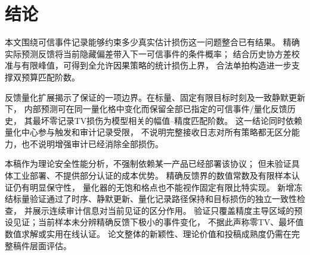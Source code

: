 \section{结论}
本文围绕可信事件记录能够约束多少真实估计损伤这一问题整合已有结果。
精确实际预测反馈将当前隐藏偏差带入下一可信事件的条件概率；
结合历史协方差校准与有限峰值，可得到全允许因果策略的统计损伤上界，
合法单拍构造进一步支撑双预算匹配阶数。

反馈量化扩展揭示了保证的一项边界。在标量、固定有限目标时刻及一致静默更新下，
内部预测可在同一量化格中变化而保留全部已指定的可信事件/量化反馈历史，
其最坏零记录TV损伤为模型相关的幅值--精度匹配阶数。
这一结论同时依赖量化中心参与触发和审计记录受限，
不说明完整接收日志对所有策略都无区分能力，也不说明增强审计已经消除全部损伤。

本稿作为理论安全性能分析，不强制依赖某一产品已经部署该协议；
但未验证具体工业部署、不提供部分认证的成本优势。
精确反馈界的数值常数及有限样本认证仍有明显保守性，
量化器的无饱和格点也不能视作固定有限比特实现。
新增冻结标量验证通过了时序、静默更新、量化记录路径保持和目标损伤的独立一致性检查，
并展示连续审计信息对当前见证的区分作用。
验证只覆盖精度主导区域的预设见证；当前样本未分辨精确反馈下极小的事件变化，
不据此声称零TV、最坏值数值求解或实用在线认证。
论文整体的新颖性、理论价值和投稿成熟度仍需在完整稿件层面评估。
